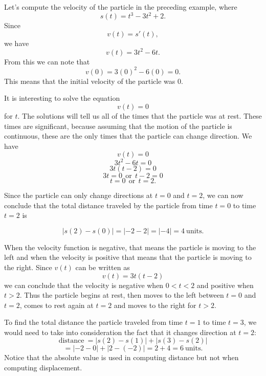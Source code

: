 \documentclass{ximera}
\begin{document}
 
\begin{example} Let's compute the velocity of the particle in the preceding example, where
\[s(t) = t^3 - 3t^2 + 2.\]
Since 
\[v(t) = s'(t),\]
we have
\[v(t) = 3t^2 - 6t.\]
From this we can note that
\[v(0) = 3(0)^2 - 6(0) = 0.\]
This means that the initial velocity of the particle was 0.  

It is interesting to solve the equation 
\[v(t) = 0\]
for $t$. The solutions will tell us all of the times that the particle was at rest. These times are significant, 
because assuming that the motion of the particle is continuous, 
these are the only times that the particle can change direction.
We have
\[v(t) = 0\]
\[3t^2 - 6t = 0\]
\[3t(t-2) = 0\]
\[3t = 0 \ \ \text{or} \ \ t-2 = 0\]
\[t = 0 \ \ \text{or} \ \ t = 2.\]

Since the particle can only change directions at $t=0$ and $t=2$, we can now conclude that the 
total distance traveled by the particle from time $t=0$ to time $t=2$ is 

\[|s(2) - s(0)| = |-2 - 2| = |-4| = 4 \ \text{units.}\]

When the velocity function is negative, that means the particle is moving to the left and when the 
velocity is positive that means that the particle is moving to the right. Since $v(t)$ can be written as
\[v(t) = 3t(t-2)\]
we can conclude that the velocity is negative when $0<t<2$ and positive when $t>2$.
Thus the particle begins at rest, then moves to the left between $t = 0$ and $t = 2$, comes to rest again at $t=2$
and moves to the right for $t>2$.

To find the total distance the particle traveled from time $t = 1$ to time $t = 3$, we would need to take into consideration
the fact that it changes direction at $t = 2$:
\[ \text{distance} \  = |s(2) - s(1)| + |s(3) -s(2)|\]
\[= |-2-0|+|2-(-2)| = 2 + 4 = 6 \ \text{units}.\]
Notice that the absolute value is used in computing distance but not when computing displacement.




\begin{center}
\end{center}

\end{example}
\end{document}
